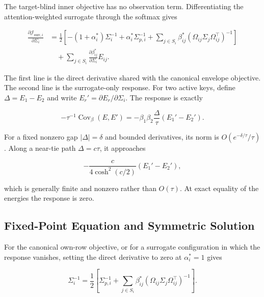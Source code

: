 \documentclass[twoside,11pt]{article}
\begin{document}
The target-blind inner objective has no observation term. Differentiating the attention-weighted surrogate through the softmax gives

\begin{equation}
\boxed{
\begin{aligned}
\frac{\partial \mathcal{J}_{\mathrm{surr},i}}{\partial \Sigma_i}
&=\frac{1}{2}
\left[
-(1+\alpha_i^*) \Sigma_i^{-1}
+ \alpha_i^*\Sigma_{p,i}^{-1}
+ \sum_{j\in S_i} \beta_{ij}^*
(\Omega_{ij}\Sigma_j\Omega_{ij}^\top)^{-1}
\right] \\
&\quad + \sum_{j\in S_i}
\frac{\partial \beta_{ij}^*}{\partial \Sigma_i}E_{ij}.
\end{aligned}
}
\label{eq:Sigma_gradient_final}
\end{equation}

The first line is the direct derivative shared with the canonical envelope objective. The second line is the surrogate-only response. For two active keys, define $\Delta=E_1-E_2$ and write $E_r'=\partial E_r/\partial\Sigma_i$. The response is exactly

\begin{equation}
-\tau^{-1}\operatorname{Cov}_{\beta}(E,E')
=-\beta_1\beta_2\frac{\Delta}{\tau}(E_1'-E_2').
\label{eq:two_key_near_tie_response}
\end{equation}

For a fixed nonzero gap $|\Delta|=\delta$ and bounded derivatives, its norm is $O(e^{-\delta/\tau}/\tau)$. Along a near-tie path $\Delta=c\tau$, it approaches

\begin{equation}
-\frac{c}{4\cosh^2(c/2)}(E_1'-E_2'),
\label{eq:near_tie_scaled_limit}
\end{equation}

which is generally finite and nonzero rather than $O(\tau)$. At exact equality of the energies the response is zero.

\subsection{Fixed-Point Equation and Symmetric Solution}

For the canonical own-row objective, or for a surrogate configuration in which the response vanishes, setting the direct derivative to zero at $\alpha_i^*=1$ gives

\begin{equation}
\Sigma_i^{-1}
=\frac{1}{2}
\left[
\Sigma_{p,i}^{-1}
+ \sum_{j\in S_i} \beta_{ij}^*
(\Omega_{ij}\Sigma_j\Omega_{ij}^\top)^{-1}
\right].
\label{eq:sigma_fixed_point_beta}
\end{equation}
\end{document}
